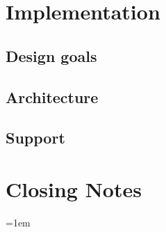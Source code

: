 \documentclass[12pt,twoside,cover,color,table]%
  {fithesis3/fithesis3/fithesis3} %
\begin{document}
  \chapter{Implementation}
    \section{Design goals}
    \section{Architecture}
    \section{ Support}
  \chapter{Closing Notes}

  \newpage
  \nocite{*}
  \emergencystretch=1em
  \printbibliography[heading=bibintoc]
  \par

  \newpage
  \printglossaries

  \printindex

%  
%  
\end{document}
